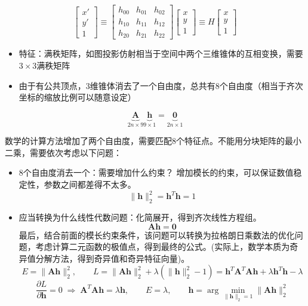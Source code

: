 \[
\begin{bmatrix} x' \\ y' \\ 1 \end{bmatrix}
\equiv
\begin{bmatrix} h_{00} & h_{01} & h_{02} \\ h_{10} & h_{11} & h_{12} \\ h_{20} & h_{21} & h_{22} \end{bmatrix}
\begin{bmatrix} x \\ y \\ 1 \end{bmatrix}
\equiv H \begin{bmatrix} x \\ y \\ 1 \end{bmatrix}
\]

\begin{itemize}
    \item 特征：满秩矩阵，如图投影仿射相当于空间中两个三维锥体的互相变换，需要$3\times3$满秩矩阵
    \item 由于有公共顶点，3维锥体消去了一个自由度，总共有8个自由度（相当于齐次坐标的缩放比例可以随意设定）
\end{itemize}

\[
\underbrace{\boldsymbol{A}}_{2n \times 9}
\underbrace{\boldsymbol{h}}_{9 \times 1}
=
\underbrace{\boldsymbol{0}}_{2n \times 1}
\]

数学的计算方法增加了两个自由度，需要匹配8个特征点。不能用分块矩阵的最小二乘，需要依次考虑以下问题：

\begin{itemize}
    \item 8个自由度消去一个：需要增加什么约束？
    增加模长的约束，可以保证数值稳定性，参数之间都差得不太多。
    \[
    \|\boldsymbol{h}\|_2^2 = \boldsymbol{h}^T \boldsymbol{h} = 1
    \]
    \item 应当转换为什么线性代数问题：化简展开，得到齐次线性方程组。
    \[
    \boldsymbol{A}\boldsymbol{h} = \boldsymbol{0}
    \]
    最后，结合前面的模长约束条件，该问题可以转换为拉格朗日乘数法的优化问题，考虑计算二元函数的极值点，得到最终的公式。(实际上，数学本质为奇异值分解方法，得到奇异值和奇异特征向量)。
    \[
    E = \|\boldsymbol{A}\boldsymbol{h}\|_2^2,
    \qquad
    L = \|\boldsymbol{A}\boldsymbol{h}\|_2^2 + \lambda\left(\|\boldsymbol{h}\|_2^2 - 1\right)
    = \boldsymbol{h}^T \boldsymbol{A}^T \boldsymbol{A} \boldsymbol{h}
    + \lambda \boldsymbol{h}^T \boldsymbol{h} - \lambda
    \]
    \[
    \frac{\partial L}{\partial \boldsymbol{h}} = 0
    \;\Longrightarrow\;
    \boldsymbol{A}^T \boldsymbol{A} \boldsymbol{h} = \lambda \boldsymbol{h},
    \qquad
    E = \lambda,
    \qquad
    \boldsymbol{h} = \arg\min_{\|\boldsymbol{h}\|_2 = 1} \|\boldsymbol{A}\boldsymbol{h}\|_2^2
    \]
\end{itemize}

